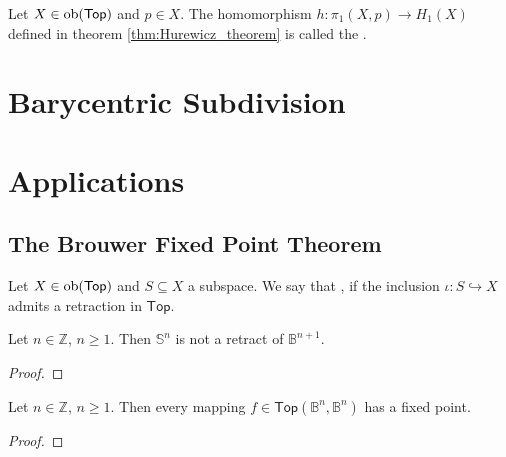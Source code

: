 \begin{definition}
	Let $X \in \operatorname{ob}(\mathsf{Top})$ and $p \in X$. The homomorphism $h : \pi_1(X,p) \to H_1(X)$ defined in theorem \ref{thm:Hurewicz_theorem} is called the .
\end{definition}

\section*{Barycentric Subdivision}



\section*{Applications}
\subsection*{The Brouwer Fixed Point Theorem}

\begin{definition}[Retract]
	Let $X \in \operatorname{ob}(\mathsf{Top})$ and $S \subseteq X$ a subspace. We say that ,  if the inclusion $\iota : S \hookrightarrow X$ admits a retraction in $\mathsf{Top}$.
\end{definition}

\begin{lemma}
	Let $n \in \mathbb{Z}$, $n \geq 1$. Then $\mathbb{S}^n$ is not a retract of $\mathbb{B}^{n + 1}$. 	
\end{lemma}

\begin{proof}
	
\end{proof}

\begin{theorem}
	Let $n \in \mathbb{Z}$, $n \geq 1$. Then every mapping $f \in \mathsf{Top}(\mathbb{B}^n,\mathbb{B}^n)$ has a fixed point.	
	\label{thm:brouwer_fixed_point}
\end{theorem}

\begin{proof}
	
\end{proof}
